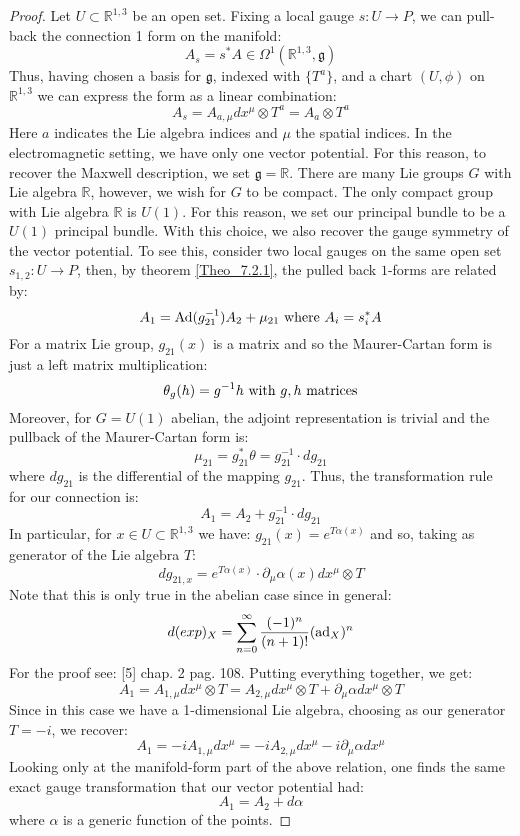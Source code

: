\documentclass[12pt,a4paper]{report}
\theoremstyle{definition}
\theoremstyle{Theorem}
\theoremstyle{definition}
\theoremstyle{definition}
\begin{document}
	\begin{proof}
		Let $U\subset \mathbb{R}^{1,3}$ be an open set. Fixing a local gauge $s:U\rightarrow P$, we can pull-back the connection 1 form on the manifold:
		$$A_{s}=s^*A\in\Omega^1(\mathbb{R}^{1,3},\mathfrak{g})$$
		Thus, having chosen a basis for $\mathfrak{g}$, indexed with $\{T^a\}$, and a chart $(U,\phi)$ on $\mathbb{R}^{1,3}$ we can express the form as a linear combination:
		$$A_{s}=A_{a,\mu} dx^\mu\otimes T^a=A_a\otimes T^a$$
		Here $a$ indicates the Lie algebra indices and $\mu$ the spatial indices. In the electromagnetic setting, we have only one vector potential. For this reason, to recover the Maxwell description, we set $\mathfrak{g}=\mathbb{R}$. There are many Lie groups $G$ with Lie algebra $\mathbb{R}$, however, we wish for $G$ to be compact. The only compact group with Lie algebra $\mathbb{R}$ is $U(1)$. For this reason, we set our principal bundle to be a $U(1)$ principal bundle. With this choice, we also recover the gauge symmetry of the vector potential. To see this, consider two local gauges on the same open set $s_{1,2}:U\rightarrow P$, then, by theorem \ref{Theo_7.2.1}, the pulled back $1$-forms are related by:
		$$A_1=\hbox{Ad}(g_{21}^{-1})A_2+\mu_{21}\hbox{ where }A_i=s_i^*A$$
		For a matrix Lie group, $g_{21}(x)$ is a matrix and so the Maurer-Cartan form is just a left matrix multiplication: $$\theta_g(h)=g^{-1}h\hbox{ with $g,h$ matrices}$$ 
		Moreover, for $G=U(1)$ abelian, the adjoint representation is trivial and the pullback of the Maurer-Cartan form is:
		$$\mu_{21}=g_{21}^*\theta=g_{21}^{-1}\cdot dg_{21}$$ 
		where $dg_{21}$ is the differential of the mapping $g_{21}$. Thus, the transformation rule for our connection is:
		$$A_1=A_2+g_{21}^{-1}\cdot dg_{21}$$
		In particular, for $x\in U\subset \mathbb{R}^{1,3}$ we have: $g_{21}(x)=e^{T\alpha(x)}$ and so, taking as generator of the Lie algebra $T$:
		$$dg_{21,x}=e^{T\alpha(x)}\cdot \partial_\mu\alpha(x)dx^\mu\otimes T$$
		Note that this is only true in the abelian case since in general:
		$$d(exp)_X=\sum_{n=0}^\infty{(-1)^n\over (n+1)!}(\hbox{ad}_X)^n$$
		For the proof see: [5] chap. 2 pag. 108. Putting everything together, we get:
		$$A_1=A_{1,\mu}dx^\mu\otimes T=A_{2,\mu}dx^\mu\otimes T+\partial_\mu\alpha dx^\mu\otimes T$$
		Since in this case we have a 1-dimensional Lie algebra, choosing as our generator $T=-i$, we recover:
		$$A_1=-iA_{1,\mu}dx^\mu=-iA_{2,\mu}dx^\mu-i\partial_\mu\alpha dx^\mu$$
		Looking only at the manifold-form part of the above relation, one finds the same exact gauge transformation that our vector potential had:
		$$A_1=A_2+d\alpha$$
		where $\alpha$ is a generic function of the points.
	\end{proof}
\end{document}
